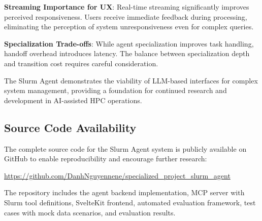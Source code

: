 \textbf{Streaming Importance for UX}: Real-time streaming significantly improves perceived responsiveness. Users receive immediate feedback during processing, eliminating the perception of system unresponsiveness even for complex queries.

\textbf{Specialization Trade-offs}: While agent specialization improves task handling, handoff overhead introduces latency. The balance between specialization depth and transition cost requires careful consideration.

The Slurm Agent demonstrates the viability of LLM-based interfaces for complex system management, providing a foundation for continued research and development in AI-assisted HPC operations.

\subsection{Source Code Availability}

The complete source code for the Slurm Agent system is publicly available on GitHub to enable reproducibility and encourage further research:

\begin{center}
    \url{https://github.com/DanhNguyennene/specialized_project_slurm_agent}
\end{center}

The repository includes the agent backend implementation, MCP server with Slurm tool definitions, SvelteKit frontend, automated evaluation framework, test cases with mock data scenarios, and evaluation results.
